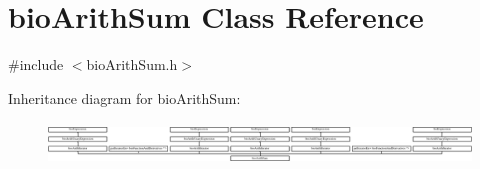 \hypertarget{classbio_arith_sum}{}\section{bio\+Arith\+Sum Class Reference}
\label{classbio_arith_sum}


{\ttfamily \#include $<$bio\+Arith\+Sum.\+h$>$}

Inheritance diagram for bio\+Arith\+Sum\+:\begin{figure}[H]
\begin{center}
\leavevmode
\includegraphics[height=1.146953cm]{classbio_arith_sum}
\end{center}
\end{figure}
